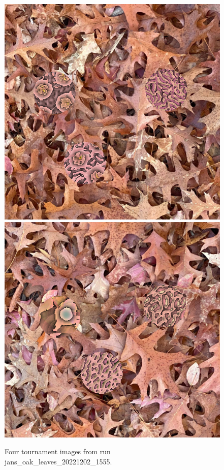 \documentclass[acmtog]{acmart}
\begin{document}
\begin{figure}
    \hfill
    \includegraphics[scale=0.24]{20221202_1555_step_6830.png}
    \hfill
    \includegraphics[scale=0.24]{20221202_1555_step_7124.png}
    \caption{Four tournament images from run jans\_oak\_leaves\_20221202\_1555.}
    \label{fig:jans_oak_leaves_4x}
\end{figure}
\end{document}
